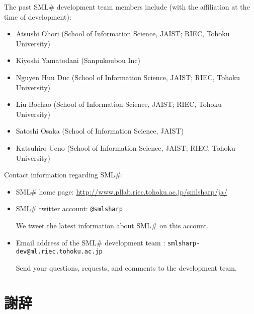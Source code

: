 \documentclass{jbook}
\newcommand{\txt}[2]{#1}
\newcommand{\smlsharp}{SML\#}
\begin{document}
	The past \smlsharp{} development team members include (with the
affiliation at the time of development):
\begin{itemize}
\item Atsushi Ohori (School of Information Science, JAIST; RIEC, Tohoku University)
\item Kiyoshi Yamatodani (Sanpukoubou Inc)
\item Nguyen Huu Duc (School of Information Science, JAIST; RIEC, Tohoku University)
\item Liu Bochao (School of Information Science, JAIST; RIEC, Tohoku University)
\item Satoshi Osaka (School of Information Science, JAIST)
\item Katsuhiro Ueno (School of Information Science, JAIST; RIEC, Tohoku University)
\end{itemize}

	Contact information regarding \smlsharp{}:
\begin{itemize}
\item \smlsharp{} home page:
\url{http://www.pllab.riec.tohoku.ac.jp/smlsharp/ja/}

%


\item \smlsharp{} twitter account:
{\tt @smlsharp}

	We tweet the latest information about \smlsharp{} on this account.

\item Email address of the \smlsharp{} development team :
{\tt smlsharp-dev@ml.riec.tohoku.ac.jp}

Send your questions, requests, and comments to the development team.
\end{itemize}
\fi%

\section{\txt{謝辞}{Acknowledgments}}
\label{sec:acknowledgements}
	
\end{document}

